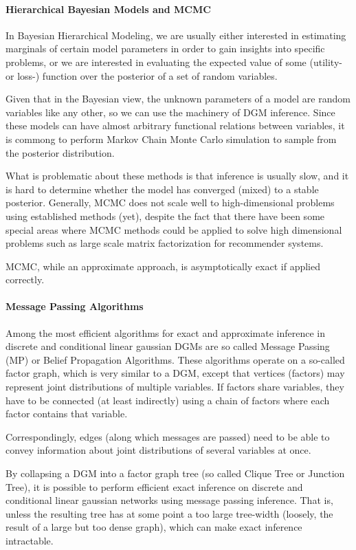 \paragraph{Hierarchical Bayesian Models and MCMC}

In Bayesian Hierarchical Modeling, we are usually either interested in
estimating marginals of certain model parameters in order to gain
insights into specific problems, or we are interested in evaluating the
expected value of some (utility- or loss-) function over the posterior
of a set of random variables.

Given that in the Bayesian view, the unknown parameters of a model are
random variables like any other, so we can use the machinery of DGM
inference. Since these models can have almost arbitrary functional
relations between variables, it is commong to perform Markov Chain Monte
Carlo simulation to sample from the posterior distribution.

What is problematic about these methods is that inference is usually
slow, and it is hard to determine whether the model has converged
(mixed) to a stable posterior. Generally, MCMC does not scale well to
high-dimensional problems using established methods (yet), despite the
fact that there have been some special areas where MCMC methods could be
applied to solve high dimensional problems such as large scale matrix
factorization for recommender systems.

MCMC, while an approximate approach, is asymptotically exact if applied
correctly.

\paragraph{Message Passing Algorithms}

Among the most efficient algorithms for exact and approximate inference
in discrete and conditional linear gaussian DGMs are so called Message
Passing (MP) or Belief Propagation Algorithms. These algorithms operate
on a so-called factor graph, which is very similar to a DGM, except that
vertices (factors) may represent joint distributions of multiple
variables. If factors share variables, they have to be connected (at
least indirectly) using a chain of factors where each factor contains
that variable.

Correspondingly, edges (along which messages are passed) need to be able
to convey information about joint distributions of several variables at
once.

By collapsing a DGM into a factor graph tree (so called Clique Tree or
Junction Tree), it is possible to perform efficient exact inference on
discrete and conditional linear gaussian networks using message passing
inference. That is, unless the resulting tree has at some point a too
large tree-width (loosely, the result of a large but too dense graph),
which can make exact inference intractable.

